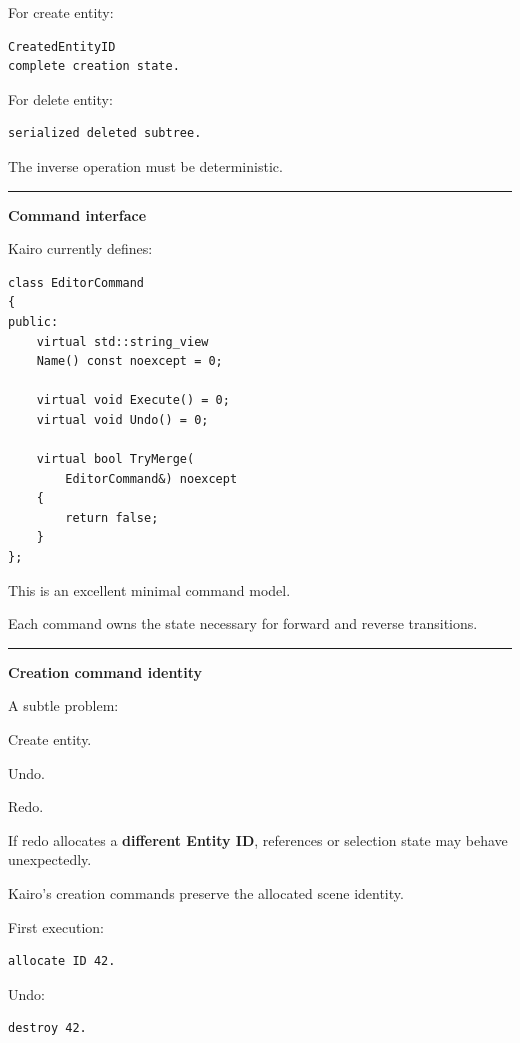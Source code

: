For create entity:

\begin{verbatim}
CreatedEntityID
complete creation state.
\end{verbatim}

For delete entity:

\begin{verbatim}
serialized deleted subtree.
\end{verbatim}

The inverse operation must be deterministic.

\begin{center}\rule{0.5\linewidth}{0.5pt}\end{center}

\textbf{Command interface}

Kairo currently defines:

\begin{verbatim}
class EditorCommand
{
public:
    virtual std::string_view
    Name() const noexcept = 0;

    virtual void Execute() = 0;
    virtual void Undo() = 0;

    virtual bool TryMerge(
        EditorCommand&) noexcept
    {
        return false;
    }
};
\end{verbatim}

This is an excellent minimal command model.

Each command owns the state necessary for forward and reverse transitions.

\begin{center}\rule{0.5\linewidth}{0.5pt}\end{center}

\textbf{Creation command identity}

A subtle problem:

Create entity.

Undo.

Redo.

If redo allocates a \textbf{different Entity ID}, references or selection state may behave unexpectedly.

Kairo's creation commands preserve the allocated scene identity.

First execution:

\begin{verbatim}
allocate ID 42.
\end{verbatim}

Undo:

\begin{verbatim}
destroy 42.
\end{verbatim}

